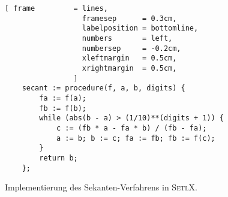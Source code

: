 \begin{figure}[!ht]
  \centering
\begin{Verbatim}[ frame         = lines, 
                  framesep      = 0.3cm, 
                  labelposition = bottomline,
                  numbers       = left,
                  numbersep     = -0.2cm,
                  xleftmargin   = 0.5cm,
                  xrightmargin  = 0.5cm,
                ]
    secant := procedure(f, a, b, digits) {
        fa := f(a); 
        fb := f(b); 
        while (abs(b - a) > (1/10)**(digits + 1)) {
            c := (fb * a - fa * b) / (fb - fa);
            a := b; b := c; fa := fb; fb := f(c); 
        }
        return b;
    };
\end{Verbatim}
\vspace*{-0.3cm}
  \caption{Implementierung des Sekanten-Verfahrens in \textsc{SetlX}.}
  \label{fig:secant.stlx}
\end{figure} %


\begin{table}[!h]
  \centering
{}
  \caption{L�sung der Gleichung $x - \cos(x) = 0$ mit dem Sekanten-Verfahren.}
  \label{tab:secant-method}
\end{table}



